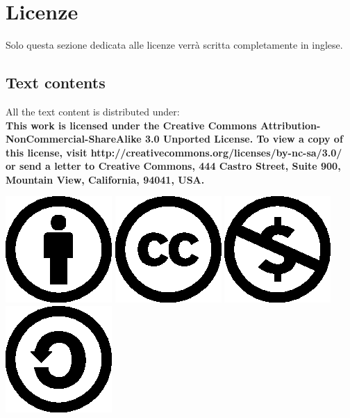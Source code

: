\newpage

\section*{Licenze}

Solo questa sezione dedicata alle licenze verr\`a scritta completamente in
inglese.

\subsection*{Text contents}
All the text content is distributed under:\\
\textbf{
This work is licensed under the Creative Commons
Attribution-NonCommercial-ShareAlike 3.0 Unported License. To view a copy of 
this license, visit http://creativecommons.org/licenses/by-nc-sa/3.0/  or send a
letter to Creative Commons, 444 Castro Street, Suite 900, Mountain View, 
California, 94041, USA.} 

\begin{center}
\includegraphics{cc-icons-eps/by}
\includegraphics{cc-icons-eps/cc}
\includegraphics{cc-icons-eps/nc}
\includegraphics{cc-icons-eps/sa}
\end{center}

